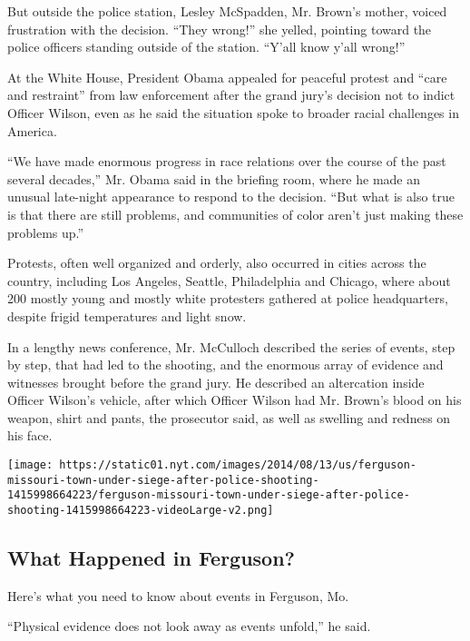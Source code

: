But outside the police station, Lesley McSpadden, Mr. Brown's mother,
voiced frustration with the decision. ``They wrong!'' she yelled,
pointing toward the police officers standing outside of the station.
``Y'all know y'all wrong!''

At the White House, President Obama appealed for peaceful protest and
``care and restraint'' from law enforcement after the grand jury's
decision not to indict Officer Wilson, even as he said the situation
spoke to broader racial challenges in America.

``We have made enormous progress in race relations over the course of
the past several decades,'' Mr. Obama said in the briefing room, where
he made an unusual late-night appearance to respond to the decision.
``But what is also true is that there are still problems, and
communities of color aren't just making these problems up.''

Protests, often well organized and orderly, also occurred in cities
across the country, including Los Angeles, Seattle, Philadelphia and
Chicago, where about 200 mostly young and mostly white protesters
gathered at police headquarters, despite frigid temperatures and light
snow.

In a lengthy news conference, Mr. McCulloch described the series of
events, step by step, that had led to the shooting, and the enormous
array of evidence and witnesses brought before the grand jury. He
described an altercation inside Officer Wilson's vehicle, after which
Officer Wilson had Mr. Brown's blood on his weapon, shirt and pants, the
prosecutor said, as well as swelling and redness on his face.

\href{https://www.nytimes.com/interactive/2014/08/13/us/ferguson-missouri-town-under-siege-after-police-shooting.html}{}

\texttt{[image: https://static01.nyt.com/images/2014/08/13/us/ferguson-missouri-town-under-siege-after-police-shooting-1415998664223/ferguson-missouri-town-under-siege-after-police-shooting-1415998664223-videoLarge-v2.png]}

\hypertarget{what-happened-in-ferguson}{%
\subsection{What Happened in
Ferguson?}\label{what-happened-in-ferguson}}

Here's what you need to know about events in Ferguson, Mo.

``Physical evidence does not look away as events unfold,'' he said.

